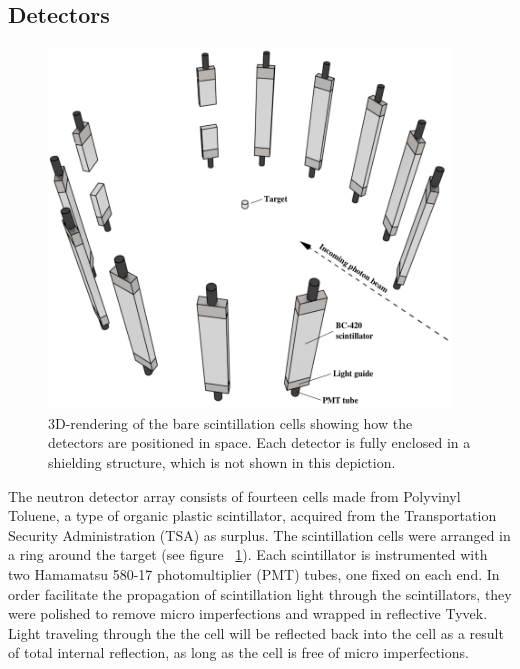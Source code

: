\subsection{Detectors}
\begin{figure}[h]
\centering
\includegraphics[width=0.95\textwidth]{Content/Methods/Detectors.png}
\caption{3D-rendering of the bare scintillation cells showing how the detectors are positioned in space.
Each detector is fully enclosed in a shielding structure, which is not shown in this depiction.}
\label{fig:DetGeom}
\end{figure}
The neutron detector array consists of fourteen cells made from Polyvinyl Toluene, a type of organic plastic scintillator, acquired from the Transportation Security Administration (TSA) as surplus.
The scintillation cells were arranged in a ring around the target (see figure ~\ref{fig:DetGeom}).
Each scintillator is instrumented with two Hamamatsu 580-17 photomultiplier (PMT) tubes, one fixed on each end.
In order facilitate the propagation of scintillation light through the scintillators, they were polished to remove micro imperfections and wrapped in reflective Tyvek.
Light traveling through the the cell will be reflected back into the cell as a result of total internal reflection, as long as the cell is free of micro imperfections.

